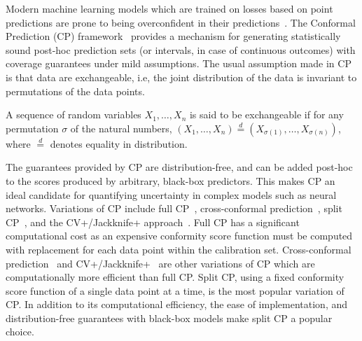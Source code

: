 Modern machine learning models which are trained on losses based on point predictions are prone to being overconfident in their predictions~\citep{guo2017calibration}. 
The Conformal Prediction (CP) framework~\citep{vovk2005algorithmic} provides a mechanism for generating statistically sound post-hoc prediction sets (or intervals, in case of continuous outcomes) with coverage guarantees under mild assumptions.
The usual assumption made in CP is that data are exchangeable, i.e, the joint distribution of the data is invariant to permutations of the data points.
\begin{definition}
    A sequence of random variables $X_1, \dots, X_n$ is said to be exchangeable if for any permutation $\sigma$ of the natural numbers, $(X_1, \dots, X_n) \overset{d}{=} (X_{\sigma(1)}, \dots, X_{\sigma(n)})$, where $\overset{d}{=}$ denotes equality in distribution.
\end{definition}
The guarantees provided by CP are distribution-free, and can be added post-hoc to the scores produced by arbitrary, black-box predictors.
This makes CP an ideal candidate for quantifying uncertainty in complex models such as neural networks.
Variations of CP include full CP~\citep{vovk2005algorithmic}, cross-conformal prediction~\citep{vovk2015cross}, split CP~\citep{vovk2005algorithmic}, and the CV+/Jackknife+ approach~\citep{barber2021predictive}.
Full CP has a significant computational cost as an expensive conformity score function must be computed with replacement for each data point within the calibration set.
Cross-conformal prediction~\citep{vovk2015cross} and CV+/Jackknife+~\citep{barber2021predictive} are other variations of CP which are computationally more efficient than full CP.
Split CP, using a fixed conformity score function of a single data point at a time, is the most popular variation of CP.
In addition to its computational efficiency, the ease of implementation, and distribution-free guarantees with black-box models make split CP a popular choice.

